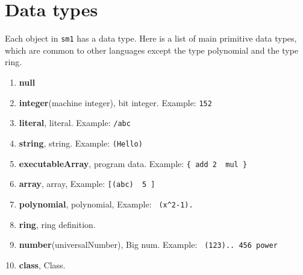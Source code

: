 \documentclass{article}
\begin{document}
\section{Data types}

Each object in {\tt sm1} has a data type.
Here is a list of main primitive data types,
which are common to other languages except the type polynomial
and the type ring.
\begin{enumerate}
\item[] {\bf null}
\item[] {\bf integer}(machine integer),  bit integer. \quad Example: {\tt 152}
\item[] {\bf literal}, \quad
   literal. \quad Example: {\tt /abc}
\item[] {\bf string}, \quad
   string. \quad Example: {\tt (Hello)}
\item[] {\bf executableArray}, \quad
   program data. \quad Example: {\tt \{ add\ 2 \ mul \} }
\item[] {\bf array}, \quad
   array, \quad Example: {\tt [(abc) \ 5 ]}
\item[] {\bf polynomial}, \quad
   polynomial, \quad Example: \verb! (x^2-1). !
\item[] {\bf ring}, \quad
   ring definition. 
\item[] {\bf number}(universalNumber), \quad
   Big num. \quad Example: \verb! (123).. 456 power !
\item[] {\bf class}, \quad
   Class.
\end{enumerate}
\end{document}
